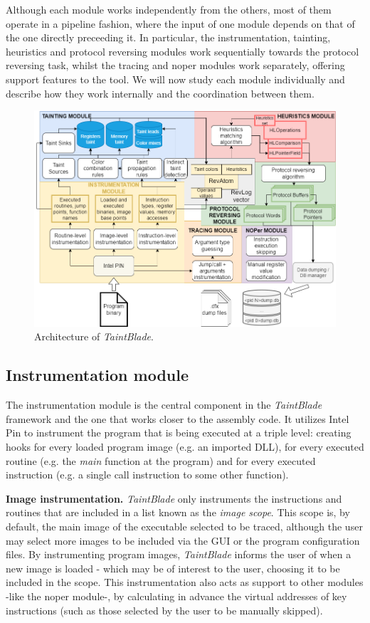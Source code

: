\documentclass[conference]{IEEEtran}
\begin{document}
Although each module works independently from the others, most of them operate
in a pipeline fashion, where the input of one module depends on that of the one
directly preceeding it. In particular, the instrumentation, tainting,
heuristics and protocol reversing modules work sequentially towards the
protocol reversing task, whilst the tracing and noper modules work separately,
offering support features to the tool. We will now study each module
individually and describe how they work internally and the coordination between
them.

\begin{figure}
    \centerline{\includegraphics[width=\textwidth]{images/archdetailedsteps.drawio.png}}
    \caption{Architecture of \textit{TaintBlade}.}
    \label{figure:fig_3_archdetailedsteps}
\end{figure}

\subsection{Instrumentation module}
The instrumentation module is the central component in the \textit{TaintBlade}
framework and the one that works closer to the assembly code. It utilizes Intel
Pin to instrument the program that is being executed at a triple level:
creating hooks for every loaded program image (e.g. an imported DLL), for every
executed routine (e.g. the \textit{main} function at the program) and for every
executed instruction (e.g. a single call instruction to some other function).

\textbf{Image instrumentation.}
\textit{TaintBlade} only instruments the instructions and routines that are included
in a list known as the \textit{image scope}. This scope is, by default, the main image of the executable
selected to be traced, although the user may select more images to be included via the GUI or
the program configuration files. By instrumenting program images, \textit{TaintBlade} informs the
user of when a new image is loaded - which may be of interest to the user, choosing it to be included
in the scope. This instrumentation also acts as support to other modules -like the noper module-, by calculating in
advance the virtual addresses of key instructions (such as those selected by the user to be manually skipped).
\end{document}
